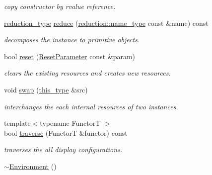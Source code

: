 \begin{DoxyCompactItemize}
\begin{DoxyCompactList}\small\item\em copy constructor by rvalue reference. \end{DoxyCompactList}\item 
\hypertarget{classhryky_1_1display_1_1_environment_a1983f9c09e1bae5ae132b704874f0f68}{\hyperlink{namespacehryky_a343a9a4c36a586be5c2693156200eadc}{reduction\-\_\-type} \hyperlink{classhryky_1_1display_1_1_environment_a1983f9c09e1bae5ae132b704874f0f68}{reduce} (\hyperlink{namespacehryky_1_1reduction_ac686c30a4c8d196bbd0f05629a6b921f}{reduction\-::name\-\_\-type} const \&name) const }\label{classhryky_1_1display_1_1_environment_a1983f9c09e1bae5ae132b704874f0f68}

\begin{DoxyCompactList}\small\item\em decomposes the instance to primitive objects. \end{DoxyCompactList}\item 
\hypertarget{classhryky_1_1display_1_1_environment_ae9bf389c9271424c89a536ce16945b8f}{bool \hyperlink{classhryky_1_1display_1_1_environment_ae9bf389c9271424c89a536ce16945b8f}{reset} (\hyperlink{structhryky_1_1display_1_1_environment_1_1_reset_parameter}{Reset\-Parameter} const \&param)}\label{classhryky_1_1display_1_1_environment_ae9bf389c9271424c89a536ce16945b8f}

\begin{DoxyCompactList}\small\item\em clears the existing resources and creates new resources. \end{DoxyCompactList}\item 
\hypertarget{classhryky_1_1display_1_1_environment_aac7b13f9cd51fb642aad55b3fd387fb5}{void \hyperlink{classhryky_1_1display_1_1_environment_aac7b13f9cd51fb642aad55b3fd387fb5}{swap} (\hyperlink{classhryky_1_1display_1_1_environment_a6318fe148797bbe0f7ca7417f3c391bd}{this\-\_\-type} \&src)}\label{classhryky_1_1display_1_1_environment_aac7b13f9cd51fb642aad55b3fd387fb5}

\begin{DoxyCompactList}\small\item\em interchanges the each internal resources of two instances. \end{DoxyCompactList}\item 
{\footnotesize template$<$typename Functor\-T $>$ }\\bool \hyperlink{classhryky_1_1display_1_1_environment_a249714e231c16676ade24abbf9570a30}{traverse} (Functor\-T \&functor) const 
\begin{DoxyCompactList}\small\item\em traverses the all display configurations. \end{DoxyCompactList}\item 
\hypertarget{classhryky_1_1display_1_1_environment_ab9e755344813de00eab713376467d05f}{\hyperlink{classhryky_1_1display_1_1_environment_ab9e755344813de00eab713376467d05f}{$\sim$\-Environment} ()}\label{classhryky_1_1display_1_1_environment_ab9e755344813de00eab713376467d05f}


\end{DoxyCompactItemize}
